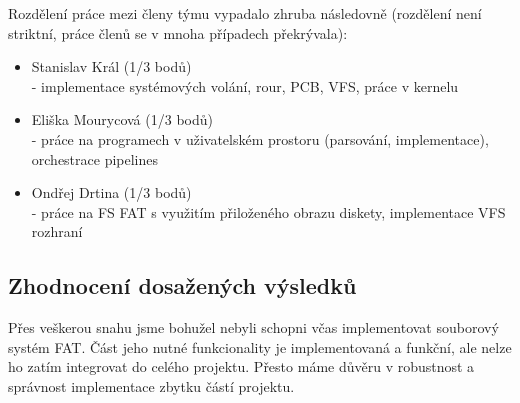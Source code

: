 \documentclass[12pt, a4paper]{article}
\begin{document}
Rozdělení práce mezi členy týmu vypadalo zhruba následovně (rozdělení není striktní, práce členů se v mnoha případech překrývala):

\begin{itemize}
	\item Stanislav Král (1/3 bodů)\\
		- implementace systémových volání, rour, PCB, VFS, práce v kernelu
	\item Eliška Mourycová (1/3 bodů) \\
		- práce na programech v uživatelském prostoru (parsování, implementace), orchestrace pipelines
	\item Ondřej Drtina (1/3 bodů) \\
		- práce na FS FAT s využitím přiloženého obrazu diskety, implementace VFS rozhraní
\end{itemize}

\subsection{Zhodnocení dosažených výsledků}
Přes veškerou snahu jsme bohužel nebyli schopni včas implementovat souborový systém FAT. Část jeho nutné funkcionality je implementovaná a funkční, ale nelze ho zatím integrovat do celého projektu. Přesto máme důvěru v robustnost a správnost implementace zbytku částí projektu.
\end{document}

